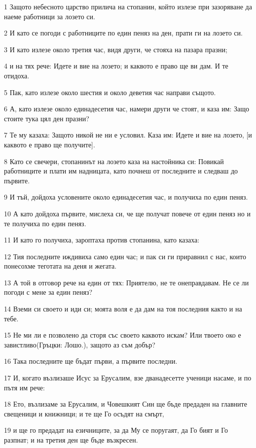 \par 1 Защото небесното царство прилича на стопанин, който излезе при зазоряване да наеме работници за лозето си.
\par 2 И като се погоди с работниците по един пеняз на ден, прати ги на лозето си.
\par 3 И като излезе около третия час, видя други, че стояха на пазара празни;
\par 4 и на тях рече: Идете и вие на лозето; и каквото е право ще ви дам. И те отидоха.
\par 5 Пак, като излезе около шестия и около деветия час направи същото.
\par 6 А, като излезе около единадесетия час, намери други че стоят, и каза им: Защо стоите тука цял ден празни?
\par 7 Те му казаха: Защото никой не ни е условил. Каза им: Идете и вие на лозето, [и каквото е право ще получите].
\par 8 Като се свечери, стопанинът на лозето каза на настойника си: Повикай работниците и плати им надницата, като почнеш от последните и следваш до първите.
\par 9 И тъй, дойдоха условените около единадесетия час, и получиха по един пеняз.
\par 10 А като дойдоха първите, мислеха си, че ще получат повече от един пеняз но и те получиха по един пеняз.
\par 11 И като го получиха, зароптаха против стопанина, като казаха:
\par 12 Тия последните иждивиха само един час; и пак си ги приравнил с нас, които понесохме теготата на деня и жегата.
\par 13 А той в отговор рече на един от тях: Приятелю, не те онеправдавам. Не се ли погоди с мене за един пеняз?
\par 14 Вземи си своето и иди си; моята воля е да дам на тоя последния както и на тебе.
\par 15 Не ми ли е позволено да сторя със своето каквото искам? Или твоето око е завистливо(Гръцки: Лошо.), защото аз съм добър?
\par 16 Така последните ще бъдат първи, а първите последни.
\par 17 И, когато възлизаше Исус за Ерусалим, взе дванадесетте ученици насаме, и по пътя им рече:
\par 18 Ето, възлизаме за Ерусалим, и Човешкият Син ще бъде предаден на главните свещеници и книжници; и те ще Го осъдят на смърт,
\par 19 и ще го предадат на езичниците, за да Му се поругаят, да Го бият и Го разпнат; и на третия ден ще бъде възкресен.
